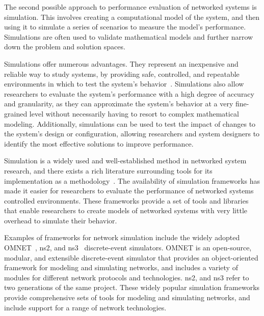 \medskip

The second possible approach to performance evaluation of networked systems is simulation.
This involves creating a computational model of the system, and then using it to simulate a series of scenarios to measure the model's performance.
Simulations are often used to validate mathematical models and further narrow down the problem and solution spaces.

Simulations offer numerous advantages.
They represent an inexpensive and reliable way to study systems, by providing safe, controlled, and repeatable environments in which to test the system's behavior~\cite{fernandes2017performance}.
Simulations also allow researchers to evaluate the system's performance with a high degree of accuracy and granularity, as they can approximate the system's behavior at a very fine-grained level without necessarily having to resort to complex mathematical modeling.
Additionally, simulations can be used to test the impact of changes to the system's design or configuration, allowing researchers and system designers to identify the most effective solutions to improve performance.

Simulation is a widely used and well-established method in networked system research, and there exists a rich literature surrounding tools for its implementation as a methodology~\cite{wehrle2010modeling}.
The availability of simulation frameworks has made it easier for researchers to evaluate the performance of networked systems controlled environments.
These frameworks provide a set of tools and libraries that enable researchers to create models of networked systems with very little overhead to simulate their behavior.

Examples of frameworks for network simulation include the widely adopted \acs{OMNET}~\cite{omnet}, \acs{ns2}, and \acs{ns3}~\cite{nsnam} discrete-event simulators.
\acs{OMNET} is an open-source, modular, and extensible discrete-event simulator that provides an object-oriented framework for modeling and simulating networks, and includes a variety of modules for different network protocols and technologies.
\acs{ns2}, and \acs{ns3} refer to two generations of the same project.
These widely popular simulation frameworks provide comprehensive sets of tools for modeling and simulating networks, and include support for a range of network technologies.

